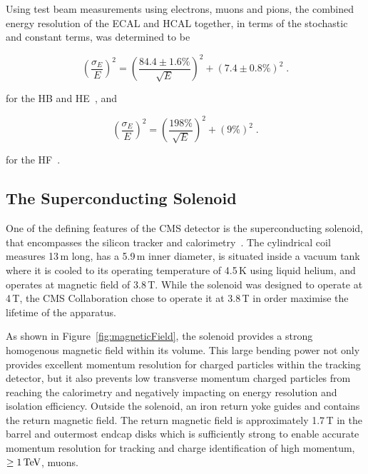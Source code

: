 Using test beam measurements using electrons, muons and pions, the combined energy resolution of the ECAL and HCAL together, in terms of the stochastic and constant terms, was determined to be

\begin{equation}
(\frac{\sigma_{E}}{E})^{2} = (\frac{84.4 \pm 1.6\%}{\sqrt{E}})^{2} + (7.4 \pm 0.8\%)^{2} \;.
\label{eq:hcalResolution}
\end{equation}

for the HB and HE~\cite{Abdullin:2008zzb}, and

\begin{equation}
(\frac{\sigma_{E}}{E})^{2} = (\frac{198\%}{\sqrt{E}})^{2} + (9\%)^{2} \;.
\label{eq:hfResolution}
\end{equation}

for the HF~\cite{Bayatian:2006jz}.

\subsection{The Superconducting Solenoid}\label{subsec:magnet}
One of the defining features of the CMS detector is the superconducting solenoid, that encompasses the silicon tracker and calorimetry~\cite{Acquistapace:1997fm,Herve:2000}.
The cylindrical coil measures 13\,m long, has a 5.9\,m inner diameter, is situated inside a vacuum tank where it is cooled to its operating temperature of 4.5\,K using liquid helium, and operates at magnetic field of 3.8\,T.
While the solenoid was designed to operate at 4\,T, the CMS Collaboration chose to operate it at 3.8\,T in order maximise the lifetime of the apparatus.

As shown in Figure~\ref{fig:magneticField}, the solenoid provides a strong homogenous magnetic field within its volume.
This large bending power not only provides excellent momentum resolution for charged particles within the tracking detector, but it also prevents low transverse momentum charged particles from reaching the calorimetry and negatively impacting on energy resolution and isolation efficiency.
Outside the solenoid, an iron return yoke guides and contains the return magnetic field.
The return magnetic field is approximately 1.7\,T in the barrel and outermost endcap disks which is sufficiently strong to enable accurate momentum resolution for tracking and charge identification of high momentum, \ie $\geq 1\,\text{Te\hspace{-.08em}V}$, muons.

